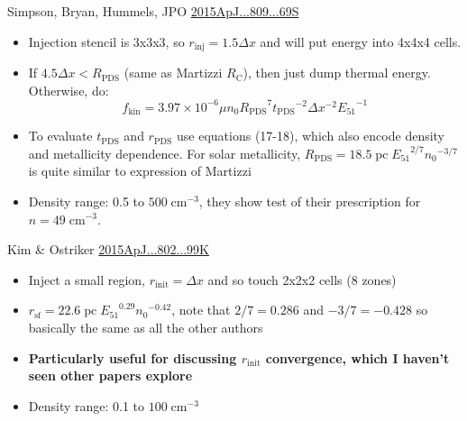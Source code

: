 \documentclass[10pt]{article}
\newcommand*{\mt}{\mathrm}
\newcommand*{\unit}[1]{\;\mt{#1}}  %
\begin{document}
Simpson, Bryan, Hummels, JPO
\href{https://ui.adsabs.harvard.edu/abs/2015ApJ...809...69S}{2015ApJ...809...69S}
\begin{itemize}
    \item Injection stencil is 3x3x3, so $r_\mt{inj} = 1.5 \Delta x$ and will
        put energy into 4x4x4 cells.
    \item If $4.5 \Delta x < R_\mt{PDS}$ (same as Martizzi $R_\mt{C}$),
        then just dump thermal energy.  Otherwise, do:
\[
    f_\mt{kin} = 3.97 \times 10^{-6} \mu n_0 {R_\mt{PDS}}^7 {t_\mt{PDS}}^{-2}
        \Delta x^{-2} {E_\mt{51}}^{-1}
\]
    \item To evaluate $t_\mt{PDS}$ and $r_\mt{PDS}$ use equations (17-18),
        which also encode density and metallicity dependence.
        For solar metallicity,
        $R_\mt{PDS} = 18.5 \unit{pc} \; {E_{51}}^{2/7} {n_0}^{-3/7}$
        is quite similar to expression of Martizzi
    \item Density range: 0.5 to $500 \unit{cm^{-3}}$, they show test of their
        prescription for $n = 49 \unit{cm^{-3}}$.
\end{itemize}

Kim \& Ostriker
\href{https://ui.adsabs.harvard.edu/abs/2015ApJ...802...99K}{2015ApJ...802...99K}
\begin{itemize}
    \item Inject a small region, $r_\mt{init} = \Delta x$ and so touch 2x2x2 cells (8 zones)
    \item $r_\mt{sf} = 22.6 \unit{pc} \; {E_{51}}^{0.29} {n_0}^{-0.42}$,
        note that $2/7 = 0.286$ and $-3/7 = -0.428$ so basically the same as
        all the other authors
    \item \textbf{Particularly useful for discussing $r_\mt{init}$ convergence,
        which I haven't seen other papers explore}
    \item Density range: 0.1 to $100 \unit{cm^{-3}}$
\end{itemize}
\end{document}
